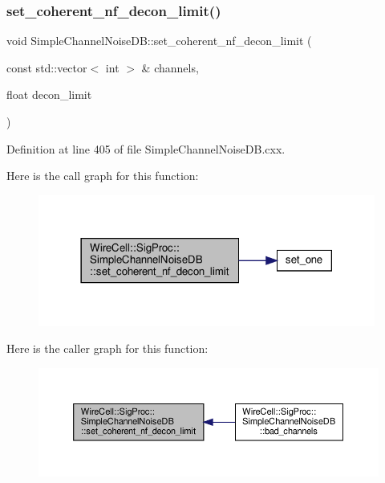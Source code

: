 \subsubsection{\texorpdfstring{set\+\_\+coherent\+\_\+nf\+\_\+decon\+\_\+limit()}{set\_coherent\_nf\_decon\_limit()}}
{\footnotesize\ttfamily void Simple\+Channel\+Noise\+D\+B\+::set\+\_\+coherent\+\_\+nf\+\_\+decon\+\_\+limit (\begin{DoxyParamCaption}\item[{const std\+::vector$<$ int $>$ \&}]{channels,  }\item[{float}]{decon\+\_\+limit }\end{DoxyParamCaption})}



Definition at line 405 of file Simple\+Channel\+Noise\+D\+B.\+cxx.

Here is the call graph for this function\+:
\nopagebreak
\begin{figure}[H]
\begin{center}
\leavevmode
\includegraphics[width=314pt]{class_wire_cell_1_1_sig_proc_1_1_simple_channel_noise_d_b_a44e68d8302a63ca34e82c9f6dfb5b209_cgraph}
\end{center}
\end{figure}
Here is the caller graph for this function\+:
\nopagebreak
\begin{figure}[H]
\begin{center}
\leavevmode
\includegraphics[width=350pt]{class_wire_cell_1_1_sig_proc_1_1_simple_channel_noise_d_b_a44e68d8302a63ca34e82c9f6dfb5b209_icgraph}
\end{center}
\end{figure}
\mbox{\label{class_wire_cell_1_1_sig_proc_1_1_simple_channel_noise_d_b_ab58c3af3127913b121bb9bee04cc56d9}} 
